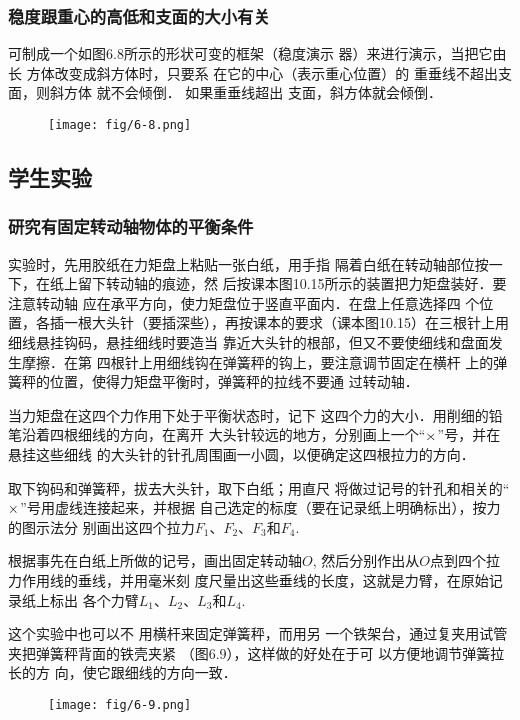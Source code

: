 \subsubsection{稳度跟重心的高低和支面的大小有关}
可制成一个如图6.8所示的形状可变的框架（稳度演示
器）来进行演示，当把它由长
方体改变成斜方体时，只要系
在它的中心（表示重心位置）的
重垂线不超出支面，则斜方体
就不会倾倒．
如果重垂线超出
支面，斜方体就会倾倒．

\begin{figure}[htp]
    \centering
    \texttt{[image: fig/6-8.png]}
    \caption{}
\end{figure}

\subsection{学生实验}
\subsubsection{研究有固定转动轴物体的平衡条件}

实验时，先用胶纸在力矩盘上粘贴一张白纸，用手指
隔着白纸在转动轴部位按一下，在纸上留下转动轴的痕迹，然
后按课本图10.15所示的装置把力矩盘装好．要注意转动轴
应在承平方向，使力矩盘位于竖直平面内．在盘上任意选择四
个位置，各插一根大头针（要插深些），再按课本的要求（课本图10.15）在三根针上用细线悬挂钩码，悬挂细线时要造当
靠近大头针的根部，但又不要使细线和盘面发生摩擦．在第
四根针上用细线钩在弹簧秤的钩上，要注意调节固定在横杆
上的弹簧秤的位置，使得力矩盘平衡时，弹簧秤的拉线不要通
过转动轴．

当力矩盘在这四个力作用下处于平衡状态时，记下
这四个力的大小．用削细的铅笔沿着四根细线的方向，在离开
大头针较远的地方，分别画上一个“$\times$”号，并在悬挂这些细线
的大头针的针孔周围画一小圆，以便确定这四根拉力的方向．

取下钩码和弹簧秤，拔去大头针，取下白纸；用直尺
将做过记号的针孔和相关的“$\times$”号用虚线连接起来，并根据
自己选定的标度（要在记录纸上明确标出），按力的图示法分
别画出这四个拉力$F_1$、$F_2$、$F_3$和$F_4$.

根据事先在白纸上所做的记号，画出固定转动轴$O$,
然后分别作出从$O$点到四个拉力作用线的垂线，并用毫米刻
度尺量出这些垂线的长度，这就是力臂，在原始记录纸上标出
各个力臂$L_1$、$L_2$、$L_3$和$L_4$.

这个实验中也可以不
用横杆来固定弹簧秤，而用另
一个铁架台，通过复夹用试管
夹把弹簧秤背面的铁壳夹紧
（图6.9），这样做的好处在于可
以方便地调节弹簧拉长的方
向，使它跟细线的方向一致．

\begin{figure}[htp]
    \centering
    \texttt{[image: fig/6-9.png]}
    \caption{}
\end{figure}

